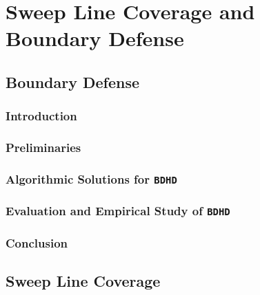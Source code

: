 
\chapter{Sweep Line Coverage and Boundary Defense}
\thispagestyle{myheadings}

\section{Boundary Defense}
\def\prob{{\texttt{{BDHD}}}\xspace}
\def\ours{{{{EDP}}}\xspace}
\def\oours{{{{OEDP}}}\xspace}
\subsection{Introduction}
\label{sec:bd-intro}
\subsection{Preliminaries}\label{sec:bd-preliminary}

\subsection{Algorithmic Solutions for \prob}\label{sec:bd-algorithm}

\subsection{Evaluation and Empirical Study of \prob}\label{sec:bd-evaluation}

\subsection{Conclusion}\label{sec:bd-conclusion}



\section{Sweep Line Coverage}






